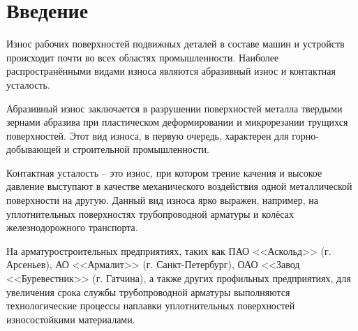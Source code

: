\chapter{Введение}
Износ рабочих поверхностей подвижных деталей в составе машин и устройств происходит почти во всех областях промышленности.
Наиболее распространёнными видами износа являются абразивный износ и контактная усталость.

Абразивный износ заключается в разрушении поверхностей металла твердыми зернами абразива при пластическом деформировании и микрорезании трущихся поверхностей.
Этот вид износа, в первую очередь, характерен для горно-добывающей и строительной промышленности.

Контактная усталость – это износ, при котором трение качения и высокое давление выступают в качестве механического воздействия одной металлической поверхности на другую.
Данный вид износа ярко выражен, например, на уплотнительных поверхностях трубопроводной арматуры и колёсах железнодорожного транспорта.
%

На арматуростроительных предприятиях, таких как ПАО <<Аскольд>> (г. Арсеньев), АО <<Армалит>> (г. Санкт-Петербург), ОАО <<Завод <<Буревестник>> (г. Гатчина), а также других профильных предприятиях, для увеличения срока службы трубопроводной арматуры выполняются технологические процессы наплавки уплотнительных поверхностей износостойкими материалами.
